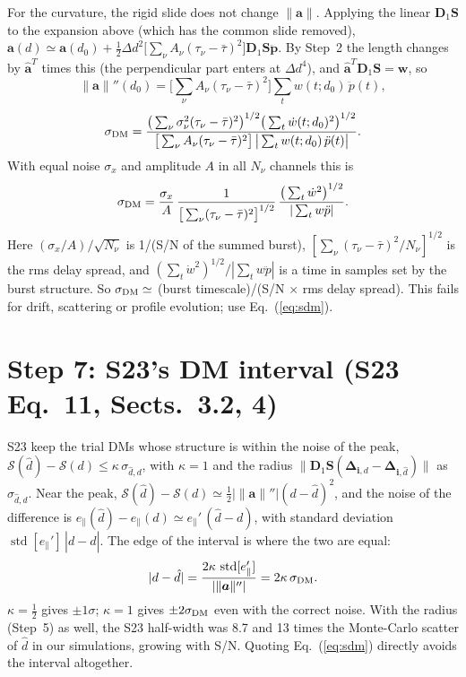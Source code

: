 \documentclass[11pt]{article}
\newcommand{\vb}[1]{\boldsymbol{#1}}
\newcommand{\Dn}{\vb D_1}
\newcommand{\Sm}{\vb S}
\newcommand{\ah}{\hat{\vb a}}
\newcommand{\nrm}[1]{\lVert #1\rVert}
\newcommand{\na}{\nrm{\vb a}}
\newcommand{\Sc}{\mathcal S}
\newcommand{\ep}{e_\parallel}
\newcommand{\tch}{\tau_{\nu}}
\newcommand{\sch}{\sigma_{\nu}}
\newcommand{\std}{\operatorname{std}}
\begin{document}
For the curvature, the rigid slide does not change $\na$. Applying the linear $\Dn\Sm$ to the expansion above
(which has the common slide removed),
$\vb a(d)\simeq\vb a(d_0)+\tfrac12\Delta d^{2}\big[\sum_{\nu}A_{\nu}(\tch-\bar\tau)^{2}\big]\Dn\Sm\ddot{\vb p}$.
By Step~2 the length changes by $\ah^{T}$ times this (the perpendicular part enters at $\Delta d^{4}$), and
$\ah^{T}\Dn\Sm=\vb w$, so
\begin{equation}
\nrm{\vb a}''(d_0)=\Big[\sum_{\nu}A_{\nu}(\tch-\bar\tau)^{2}\Big]\sum_tw(t;d_0)\,\ddot p(t),
\end{equation}
\begin{equation}
\sigma_{\rm DM}=\frac{\big(\sum_{\nu}\sch^{2}(\tch-\bar\tau)^{2}\big)^{1/2}\big(\sum_t\dot w(t;d_0)^{2}\big)^{1/2}}
{\big[\sum_{\nu}A_{\nu}(\tch-\bar\tau)^{2}\big]\,\big|\sum_tw(t;d_0)\,\ddot p(t)\big|}.
\end{equation}
With equal noise $\sigma_x$ and amplitude $A$ in all $N_{\nu}$ channels this is
\begin{equation}
\sigma_{\rm DM}=\frac{\sigma_x}{A}\,\frac{1}{\big[\sum_{\nu}(\tch-\bar\tau)^{2}\big]^{1/2}}\,
\frac{\big(\sum_t\dot w^{2}\big)^{1/2}}{|\sum_tw\ddot p|}.
\end{equation}
Here $(\sigma_x/A)/\sqrt{N_{\nu}}$ is 1/(S/N of the summed burst), $[\sum_{\nu}(\tch-\bar\tau)^{2}/N_{\nu}]^{1/2}$
is the rms delay spread, and $(\sum_t\dot w^{2})^{1/2}/|\sum_tw\ddot p|$ is a time in samples set by the burst
structure. So $\sigma_{\rm DM}\simeq$ (burst timescale)/(S/N $\times$ rms delay spread). This fails for drift,
scattering or profile evolution; use Eq.~(\ref{eq:sdm}).

\section*{Step 7: S23's DM interval (S23 Eq.~11, Sects.~3.2, 4)}

S23 keep the trial DMs whose structure is within the noise of the peak,
$\Sc(\hat d)-\Sc(d)\le\kappa\,\sigma_{\hat d,d}$, with $\kappa=1$ and the radius $\nrm{\Dn\Sm(\vb\Delta_{\vb i,d}-\vb\Delta_{\vb i,\hat d})}$
as $\sigma_{\hat d,d}$. Near the peak, $\Sc(\hat d)-\Sc(d)\simeq\tfrac12|\nrm{\vb a}''|(d-\hat d)^{2}$, and the noise of
the difference is $\ep(\hat d)-\ep(d)\simeq\ep'\,(\hat d-d)$, with standard deviation $\std[\ep']\,|d-\hat d|$. The
edge of the interval is where the two are equal:
\begin{equation}
|d-\hat d|=\frac{2\kappa\,\std[\ep']}{|\nrm{\vb a}''|}=2\kappa\,\sigma_{\rm DM}.
\end{equation}
$\kappa=\tfrac12$ gives $\pm1\sigma$; $\kappa=1$ gives $\pm2\sigma_{\rm DM}$ even with the correct noise. With the radius
(Step~5) as well, the S23 half-width was 8.7 and 13 times the Monte-Carlo scatter of $\hat d$ in our simulations,
growing with S/N. Quoting Eq.~(\ref{eq:sdm}) directly avoids the interval altogether.
\end{document}

